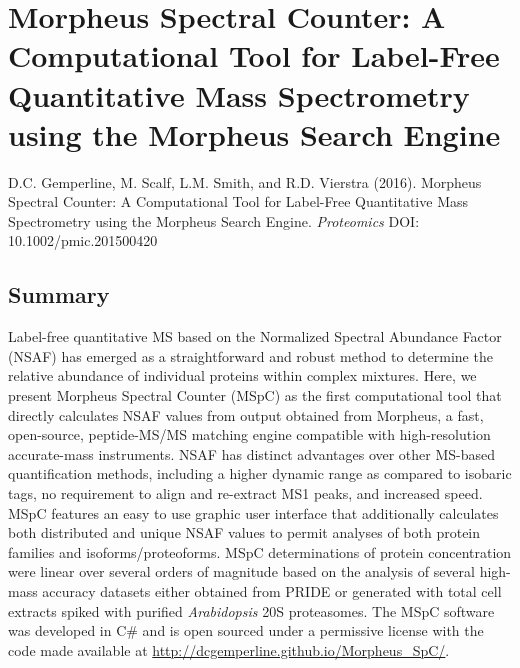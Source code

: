 \chapter{Morpheus Spectral Counter: A Computational Tool for Label-Free Quantitative Mass Spectrometry using the Morpheus Search Engine}

D.C. Gemperline, M. Scalf, L.M. Smith, and R.D. Vierstra (2016). Morpheus Spectral Counter: A Computational Tool for Label-Free Quantitative Mass Spectrometry using the Morpheus Search Engine. \textit{Proteomics} DOI: 10.1002/pmic.201500420 \\


\section{Summary}
Label-free quantitative MS based on the Normalized Spectral Abundance Factor (NSAF) has emerged as a straightforward and robust method to determine the relative abundance of individual proteins within complex mixtures.
Here, we present Morpheus Spectral Counter (MSpC) as the first computational tool that directly calculates NSAF values from output obtained from Morpheus, a fast, open-source, peptide-MS/MS matching engine compatible with high-resolution accurate-mass instruments.
NSAF has distinct advantages over other MS-based quantification methods, including a higher dynamic range as compared to isobaric tags, no requirement to align and re-extract MS1 peaks, and increased speed.
MSpC features an easy to use graphic user interface that additionally calculates both distributed and unique NSAF values to permit analyses of both protein families and isoforms/proteoforms.
MSpC determinations of protein concentration were linear over several orders of magnitude based on the analysis of several high-mass accuracy datasets either obtained from PRIDE or generated with total cell extracts spiked with purified \textit{Arabidopsis} 20S proteasomes.
The MSpC software was developed in C\# and is open sourced under a permissive license with the code made available at \url{http://dcgemperline.github.io/Morpheus_SpC/}. 

